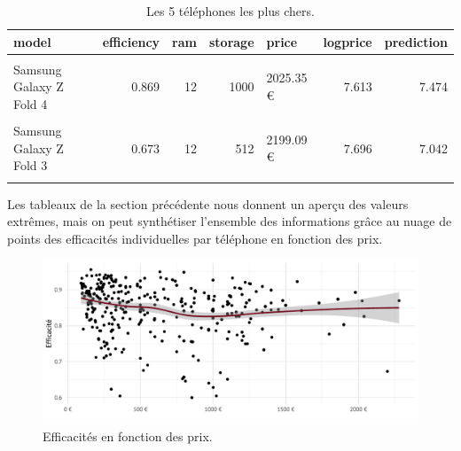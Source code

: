 \documentclass[
  12pt,
]{report}
\begin{document}
\begin{table}[!h]
\centering
\caption{\label{tab:kbl_inexpensive}Les 5 téléphones les plus chers.}
\centering
\begin{tabular}[t]{lrrrlrr}
\toprule
\textbf{model} & \textbf{efficiency} & \textbf{ram} & \textbf{storage} & \textbf{price} & \textbf{logprice} & \textbf{prediction}\\
\midrule
\cellcolor{gray!10}{iPhone 15 Pro Max} & \cellcolor{gray!10}{0.893} & \cellcolor{gray!10}{8} & \cellcolor{gray!10}{1000} & \cellcolor{gray!10}{1979 €} & \cellcolor{gray!10}{7.590} & \cellcolor{gray!10}{7.548}\\
Samsung Galaxy Z Fold 4 & 0.869 & 12 & 1000 & 2025.35 € & 7.613 & 7.474\\
\cellcolor{gray!10}{Samsung Galaxy Z Fold 5} & \cellcolor{gray!10}{0.826} & \cellcolor{gray!10}{12} & \cellcolor{gray!10}{512} & \cellcolor{gray!10}{2039 €} & \cellcolor{gray!10}{7.620} & \cellcolor{gray!10}{7.343}\\
Samsung Galaxy Z Fold 3 & 0.673 & 12 & 512 & 2199.09 € & 7.696 & 7.042\\
\cellcolor{gray!10}{Samsung Galaxy Z Fold 5} & \cellcolor{gray!10}{0.870} & \cellcolor{gray!10}{12} & \cellcolor{gray!10}{1000} & \cellcolor{gray!10}{2279 €} & \cellcolor{gray!10}{7.731} & \cellcolor{gray!10}{7.595}\\
\bottomrule
\end{tabular}
\end{table}

\newpage

Les tableaux de la section précédente nous donnent un aperçu des valeurs
extrêmes, mais on peut synthétiser l'ensemble des informations grâce au
nuage de points des efficacités individuelles par téléphone en fonction
des prix.

\begin{figure}[H]

{\centering \includegraphics{report_files/figure-pdf/unnamed-chunk-8-1.pdf}

}

\caption{Efficacités en fonction des prix.}

\end{figure}%
\end{document}
